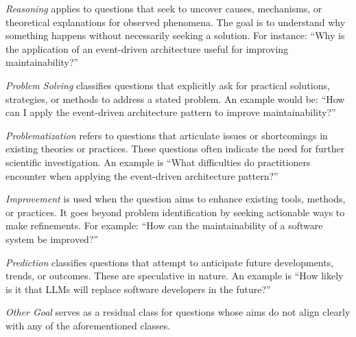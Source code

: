 \emph{Reasoning} applies to questions that seek to uncover causes, mechanisms, or theoretical explanations for observed phenomena. The goal is to understand why something happens without necessarily seeking a solution. For instance: \enquote{Why is the application of an event-driven architecture useful for improving maintainability?}

\emph{Problem Solving} classifies questions that explicitly ask for practical solutions, strategies, or methods to address a stated problem. An example would be: \enquote{How can I apply the event-driven architecture pattern to improve maintainability?}

\emph{Problematization} refers to questions that articulate issues or shortcomings in existing theories or practices. These questions often indicate the need for further scientific investigation. An example is \enquote{What difficulties do practitioners encounter when applying the event-driven architecture pattern?}

\emph{Improvement} is used when the question aims to enhance existing tools, methods, or practices. It goes beyond problem identification by seeking actionable ways to make refinements. For example: \enquote{How can the maintainability of a software system be improved?}

\emph{Prediction} classifies questions that attempt to anticipate future developments, trends, or outcomes. These are speculative in nature. An example is \enquote{How likely is it that LLMs will replace software developers in the future?}

\emph{Other Goal} serves as a residual class for questions whose aims do not align clearly with any of the aforementioned classes.






